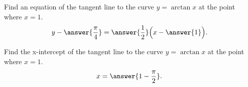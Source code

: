 \documentclass{ximera}
\author{Nela Lakos }
\begin{document}
\begin{exercise}

Find an equation of the tangent line to the curve $y=\arctan{x}$ at the point where $x=1$. 
\[
y-\answer{\frac{\pi}{4}} = \answer{\frac{1}{2}}\Bigl(x-\answer{1}\Bigr).
\]

\end{exercise}
\begin{exercise}

Find the x-intercept of the tangent line to the curve $y=\arctan{x}$ at the point where $x=1$. 
\[
x = \answer{1-\frac{\pi}{2}}.
\]

\end{exercise}
\end{document}
